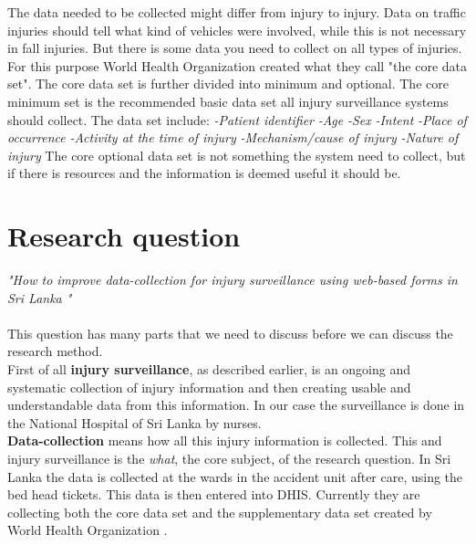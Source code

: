 \documentclass[UKenglish, 12pt]{article}
\newcommand{\WHO}{World Health Organization }
\newcommand{\RQ}{How to improve data-collection for injury surveillance
using web-based forms in Sri Lanka }
\newcommand{\is}{injury surveillance}
\begin{document}
The data needed to be collected might differ from injury to injury. Data on
traffic injuries should tell what kind of vehicles were involved, while this is
not necessary in fall injuries. But there is some data you need to collect on all
types of injuries. For this purpose \WHO created what they call "the core data
set".\cite[25]{who-guide} The core data set is further divided into minimum and
optional. The core minimum set is the recommended basic data set all \is
systems should collect. The data set include:
\newline \emph{-Patient identifier}
\newline \emph{-Age}
\newline \emph{-Sex}
\newline \emph{-Intent}
\newline \emph{-Place of occurrence}
\newline \emph{-Activity at the time of injury}
\newline \emph{-Mechanism/cause of injury}
\newline \emph{-Nature of injury}
\newline The core optional data set is not something
the system need to collect, but if there is resources and the information is
deemed useful it should be. 


\newpage \section*{Research question} 
\textit{"\RQ"} \\\\ This question has
many parts that we need to discuss before we can discuss the research
method.\\

First of all \textbf{\is}, as described earlier, is an ongoing and
systematic collection of injury information and then creating usable and
understandable data from this information. In our case the surveillance is done
in the National Hospital of Sri Lanka by nurses. \\

\textbf{Data-collection} means how all this injury information is
collected. This and injury surveillance is the \textit{what}, the core subject, of the
research question. In Sri Lanka the data is collected at the wards in the
accident unit after care, using the bed head tickets. This data is then entered
into DHIS. Currently they are collecting both the core data set and the
supplementary data set created by \WHO.\\
\end{document}
